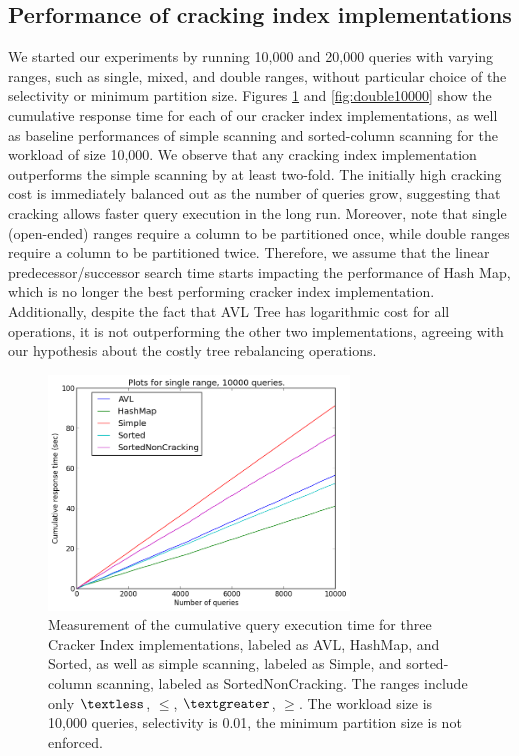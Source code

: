 \subsection{Performance of cracking index implementations}
We started our experiments by running 10,000 and 20,000 queries with varying ranges, such as single, mixed, and double ranges, without particular choice of the selectivity or minimum partition size. Figures \ref{fig:single10000} and \ref{fig:double10000} show the cumulative response time for each of our cracker index implementations, as well as baseline performances of simple scanning and sorted-column scanning for the workload of size 10,000. We observe that any cracking index implementation outperforms the simple scanning by at least two-fold. The initially high cracking cost is immediately balanced out as the number of queries grow, suggesting that cracking allows faster query execution in the long run. Moreover, note that single (open-ended) ranges require a column to be partitioned once, while double ranges require a column to be partitioned twice. Therefore, we assume that the linear predecessor/successor search time starts impacting the performance of Hash Map, which is no longer the best performing cracker index implementation. Additionally, despite the fact that AVL Tree has logarithmic cost for all operations, it is not outperforming the other two implementations, agreeing with our hypothesis about the costly tree rebalancing operations.

\begin{figure}[h]
\centering
\includegraphics[width=8cm]{figures/single10000}
\caption{Measurement of the cumulative query execution time for three Cracker Index implementations, labeled as AVL, HashMap, and Sorted, as well as simple scanning, labeled as Simple, and sorted-column scanning, labeled as SortedNonCracking. The ranges include only $\textless$, $\leq$, $\textgreater$, $\geq$. The workload size is 10,000 queries, selectivity is 0.01, the minimum partition size is not enforced.}
\label{fig:single10000}
\end{figure}


